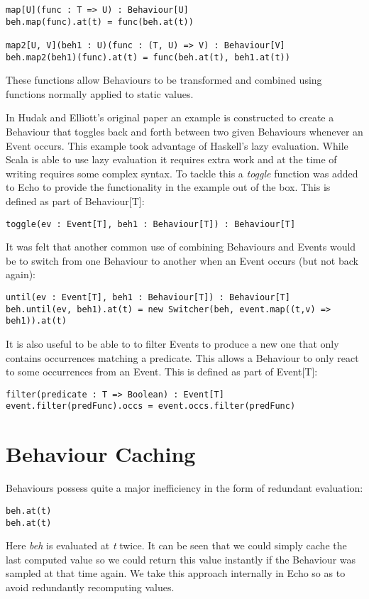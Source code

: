 \begin{verbatim}
map[U](func : T => U) : Behaviour[U]
beh.map(func).at(t) = func(beh.at(t))

map2[U, V](beh1 : U)(func : (T, U) => V) : Behaviour[V]
beh.map2(beh1)(func).at(t) = func(beh.at(t), beh1.at(t))
\end{verbatim}        

    These functions allow Behaviours to be transformed and combined using functions
    normally applied to static values.
    
    In Hudak and Elliott's original paper an example is constructed to create a Behaviour
    that toggles back and forth between two given Behaviours whenever an Event occurs. This
    example took advantage of Haskell's lazy evaluation. While Scala is able to use lazy evaluation
    it requires extra work and at the time of writing requires some complex syntax. To tackle this
    a \emph{toggle} function was added to Echo to provide the functionality in the example out of the box.
    This is defined as part of Behaviour[T]:
    
\begin{verbatim}
toggle(ev : Event[T], beh1 : Behaviour[T]) : Behaviour[T]
\end{verbatim}        
    
    It was felt that another common use of combining Behaviours and Events would be
    to switch from one Behaviour to another when an Event occurs (but not back again):

\begin{verbatim}
until(ev : Event[T], beh1 : Behaviour[T]) : Behaviour[T]
beh.until(ev, beh1).at(t) = new Switcher(beh, event.map((t,v) => beh1)).at(t)
\end{verbatim}        
    
    It is also useful to be able to to filter Events to produce a new one that only
    contains occurrences matching a predicate. This allows a Behaviour to only react
    to some occurrences from an Event. This is defined as part of Event[T]:

\begin{verbatim}
filter(predicate : T => Boolean) : Event[T]
event.filter(predFunc).occs = event.occs.filter(predFunc)
\end{verbatim}  

  \section{Behaviour Caching}
    Behaviours possess quite a major inefficiency in the form of redundant evaluation:

\begin{verbatim}
beh.at(t)
beh.at(t)
\end{verbatim}  

    Here \emph{beh} is evaluated at \emph{t} twice. It can be seen that we could simply cache the last
    computed value so we could return this value instantly if the Behaviour was sampled at that time again.
    We take this approach internally in Echo so as to avoid redundantly recomputing values. 